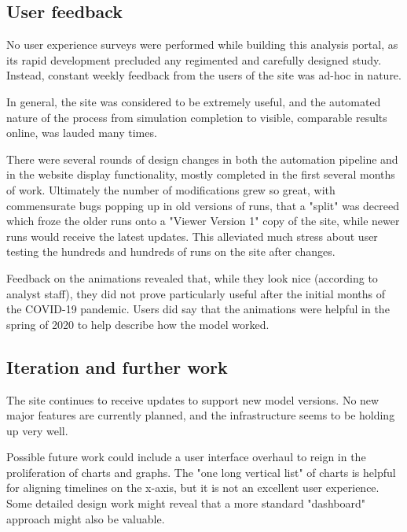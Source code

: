 \hypertarget{covid-user-feedback}{%
\subsection{User feedback}\label{user-feedback}}

No user experience surveys were performed while building this analysis portal, as its rapid development precluded any regimented and carefully designed study. Instead, constant weekly feedback from the users of the site was ad-hoc in nature.

In general, the site was considered to be extremely useful, and the automated nature of the process from simulation completion to visible, comparable results online, was lauded many times.

There were several rounds of design changes in both the automation pipeline and in the website display functionality, mostly completed in the first several months of work. Ultimately the number of modifications grew so great, with commensurate bugs popping up in old versions of runs, that a "split" was decreed which froze the older runs onto a "Viewer Version 1" copy of the site, while newer runs would receive the latest updates. This alleviated much stress about user testing the hundreds and hundreds of runs on the site after changes.

Feedback on the animations revealed that, while they look nice (according to analyst staff), they did not prove particularly useful after the initial months of the COVID-19 pandemic. Users did say that the animations were helpful in the spring of 2020 to help describe how the model worked.

\hypertarget{covid-iteration-and-further-work}{%
\subsection{Iteration and further work}\label{covid-iteration-and-further-work}}

The site continues to receive updates to support new model versions. No new major features are currently planned, and the infrastructure seems to be holding up very well.

Possible future work could include a user interface overhaul to reign in the proliferation of charts and graphs. The "one long vertical list" of charts is helpful for aligning timelines on the x-axis, but it is not an excellent user experience. Some detailed design work might reveal that a more standard "dashboard" approach might also be valuable.

